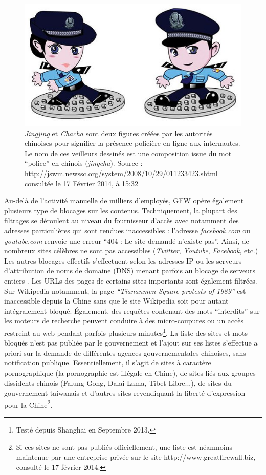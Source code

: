 \begin{figure}[htbp]
    \centering
    \includegraphics{figures/chap1/jingcha.jpg}
    \caption[Jingjing et Chacha, les policiers de l'Internet chinois]{\textit{Jingjing} et \textit{Chacha} sont deux figures créées par les autorités chinoises pour signifier la présence policière en ligne aux internautes. Le nom de ces veilleurs dessinés est une composition issue du mot “police” en chinois (\textit{jingcha}). Source : \url{http://jswm.newssc.org/system/2008/10/29/011233423.shtml} consultée le 17 Février 2014, à 15:32}
    \label{fig:jingcha}
\end{figure}

Au-delà de l’activité manuelle de milliers d’employés, GFW opère également plusieurs type de blocages sur les contenus. Techniquement, la plupart des filtrages se déroulent au niveau du fournisseur d’accès avec notamment des adresses particulières qui sont rendues inaccessibles : l’adresse \textit{facebook.com} ou \textit{youtube.com} renvoie une erreur “404 : Le site demandé n’existe pas”. Ainsi, de nombreux sites célèbres ne sont pas accessibles (\textit{Twitter}, \textit{Youtube}, \textit{Facebook}, etc.) Les autres blocages effectifs s’effectuent selon les adresses IP ou les serveurs d’attribution de noms de domaine (DNS) menant parfois au blocage de serveurs entiers \citep{Winter2012}. Les URLs des pages de certains sites importants sont également filtrées. Sur Wikipedia notamment, la page \textit{“Tiananmen Square protests of 1989”} est inaccessible depuis la Chine sans que le site Wikipedia soit pour autant intégralement bloqué. Également, des requêtes contenant des mots “interdits” sur les moteurs de recherche peuvent conduire à des micro-coupures ou un accès restreint au web pendant parfois plusieurs minutes\footnote{Testé depuis Shanghai en Septembre 2013.}. La liste des sites et mots bloqués n’est pas publiée par le gouvernement et l’ajout sur ses listes s’effectue a priori sur la demande de différentes agences gouvernementales chinoises, sans notification publique. Essentiellement, il s’agit de sites à caractère pornographique (la pornographie est illégale en Chine), de sites liés aux groupes dissidents chinois (Falung Gong, Dalai Lama, Tibet Libre...), de sites du gouvernement taiwanais et d’autres sites revendiquant la liberté d’expression pour la Chine\footnote{Si ces sites ne sont pas publiés officiellement, une liste est néanmoins maintenue par une entreprise privée sur le site http://www.greatfirewall.biz, consulté le 17 février 2014.}.

